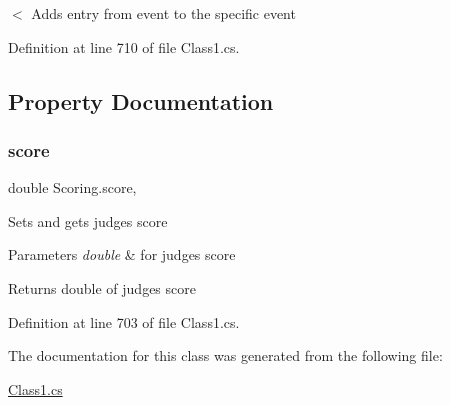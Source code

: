 $<$ Adds entry from event to the specific event 

Definition at line 710 of file Class1.\+cs.



\subsection{Property Documentation}
\mbox{\label{classScoring_a98cbf9ebbee504f67d1ebcbb45f3bf40}} 
\subsubsection{\texorpdfstring{score}{score}}
{\footnotesize\ttfamily double Scoring.\+score\hspace{0.3cm}{\ttfamily [get]}, {\ttfamily [set]}}

Sets and gets judge\textquotesingle{}s score 
\begin{DoxyParams}{Parameters}
{\em double} & for judge\textquotesingle{}s score \\
\hline
\end{DoxyParams}
\begin{DoxyReturn}{Returns}
double of judge\textquotesingle{}s score 
\end{DoxyReturn}


Definition at line 703 of file Class1.\+cs.



The documentation for this class was generated from the following file\+:\begin{DoxyCompactItemize}
\item 
\hyperlink{Class1_8cs}{Class1.\+cs}\end{DoxyCompactItemize}
